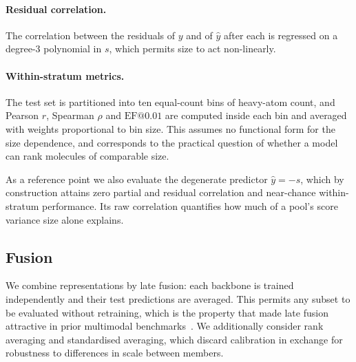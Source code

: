 \paragraph{Residual correlation.}
The correlation between the residuals of $y$ and of $\hat{y}$ after each is
regressed on a degree-3 polynomial in $s$, which permits size to act
non-linearly.

\paragraph{Within-stratum metrics.}
The test set is partitioned into ten equal-count bins of heavy-atom count, and
Pearson $r$, Spearman $\rho$ and $\mathrm{EF}@0.01$ are computed inside each
bin and averaged with weights proportional to bin size. This assumes no
functional form for the size dependence, and corresponds to the practical
question of whether a model can rank molecules of comparable size.

As a reference point we also evaluate the degenerate predictor
$\hat{y} = -s$, which by construction attains zero partial and residual
correlation and near-chance within-stratum performance. Its raw correlation
quantifies how much of a pool's score variance size alone explains.

\subsection{Fusion}

We combine representations by late fusion: each backbone is trained
independently and their test predictions are averaged. This permits any subset
to be evaluated without retraining, which is the property that made late fusion
attractive in prior multimodal
benchmarks~\citep{martinezgalindo2026multimodality}. We additionally consider
rank averaging and standardised averaging, which discard calibration in
exchange for robustness to differences in scale between members.
